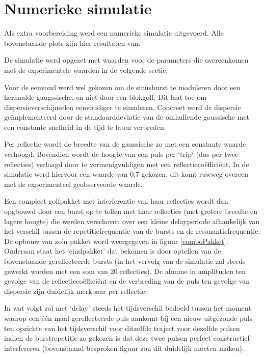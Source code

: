 \section{Numerieke simulatie}
Als extra voorbereiding werd een numerieke simulatie uitgevoerd. Alle 
bovenstaande plots zijn hier resultaten van.

De simulatie werd opgezet met waarden voor de parameters die overeenkomen 
met de experimentele waarden in de volgende sectie.

Voor de eenvoud werd wel gekozen om de sinusburst te moduleren door een 
herhaalde gaugssische, en niet door een blokgolf. Dit laat toe om 
dispersieverschijnselen eenvoudiger te simuleren. Concreet werd de 
dispersie ge\"implementeerd door de standaarddeviatie van de omhullende 
gaussische met een constante snelheid in de tijd te laten verbreden.

Per reflectie wordt de breedte van de gaussische zo met een constante 
waarde verhoogd. Bovendien wordt de hoogte van een puls per `trip` (dus per 
twee reflecties) verlaagd door te vermenigvuldigen met een 
reflectieco\"effici\"ent. In de simulatie werd hiervoor een waarde van 
$0.7$ gekozen, dit komt ruwweg overeen met de experimenteel geobserveerde 
waarde.

Een compleet golfpakket met interferentie van haar reflecties wordt dan 
opgbouwd door een burst op te tellen met haar reflecties (met grotere 
breedte en lagere hoogte) die werden verschoven over een kleine 
delayperiode afhankelijk van het verschil tussen de repetitiefrequentie van 
de bursts en de resonantiefrequentie. De opbouw van zo'n pakket word 
weergegeven in figuur \ref{comboPakket}. Onderaan staat het `eindpakket' 
dat bekomen is door optellen van de bovenstaande gereflecteerde bursts (in 
het vervolg van de simulatie zal steeds gewerkt worden met een som van 20 
reflecties). De afname in amplituden ten gevolge van de 
reflectieco\"effici\"ent en de verbreding van de puls ten gevolge van 
dispersie zijn duidelijk merkbaar per reflectie.


In wat volgt zal met `delay' steeds het tijdsverschil bedoeld tussen het 
moment waarop een \'e\'en maal gereflecteerde puls aankomt bij een nieuw 
uitgezonde puls ten opzichte van het tijdsverschil voor ditzelfde traject 
voor dezelfde pulsen indien de burstrepetitie zo gekozen is dat deze twee 
pulsen perfect constructief interfereren (bovenstaand besproken figuur zou 
dit duidelijk moeten maken).

